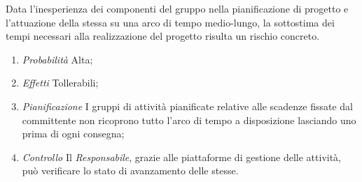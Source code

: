 Data l'inesperienza dei componenti del gruppo nella pianificazione di progetto e l'attuazione della stessa su una arco di tempo medio-lungo, la sottostima dei tempi necessari alla realizzazione del progetto risulta un rischio concreto.

\begin{enumerate}
\item \textit{Probabilità} Alta;
\item \textit{Effetti} Tollerabili;
\item \textit{Pianificazione} I gruppi di attività pianificate relative alle scadenze fissate dal committente non ricoprono tutto l'arco di tempo a disposizione lasciando uno  prima di ogni consegna; 
\item \textit{Controllo} Il \textit{Responsabile}, grazie alle piattaforme di gestione delle attività, può verificare lo stato di avanzamento delle stesse.
\end{enumerate}
